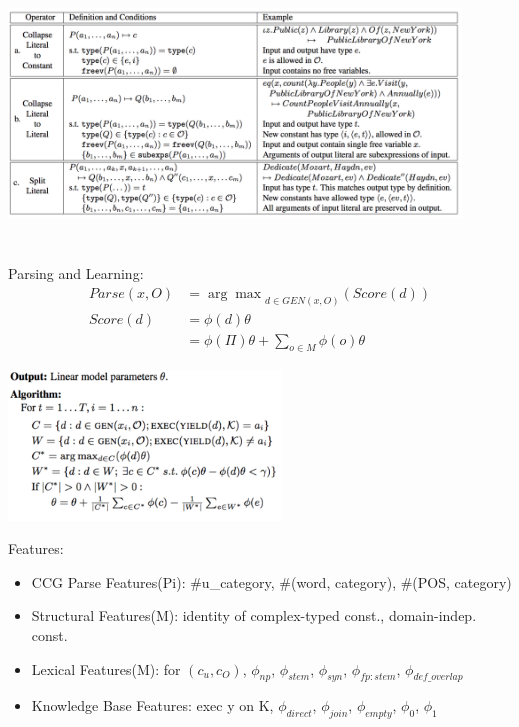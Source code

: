 \documentclass{beamer}
\begin{document}
\begin{frame}
     {
        \begin{center}
            \includegraphics[width=12cm,height=7cm]{img/ontology-match-ops.png}
        \end{center}
    }

     {
        Parsing and Learning:
        \begin{align*}
            Parse(x, O) &= {\arg \max}_{d\in GEN(x,O)} (Score(d)) \\
            Score(d)  &= \phi(d) \theta \\
            &= \phi(\Pi)\theta + \sum_{o\in M}\phi(o)\theta
        \end{align*}
        \begin{center}
            \includegraphics[width=7.26cm,height=4cm]{img/ccg-fb-learning.png}
        \end{center}
    }

     {
        Features:
        \begin{itemize}
            \item CCG Parse Features(Pi): \#u\_category, \#(word, category), \#(POS, category)
            \item Structural Features(M): identity of complex-typed const., domain-indep. const.
            \item Lexical Features(M): for $(c_u, c_O)$, $\phi_{np}$, $\phi_{stem}$,
                $\phi_{syn}$, $\phi_{fp:stem}$, $\phi_{def\_overlap}$

            \item Knowledge Base Features: exec y on K, $\phi_{direct}$, $\phi_{join}$,
                $\phi_{empty}$, $\phi_0$, $\phi_1$
        \end{itemize}
    }
\end{frame}
\end{document}
